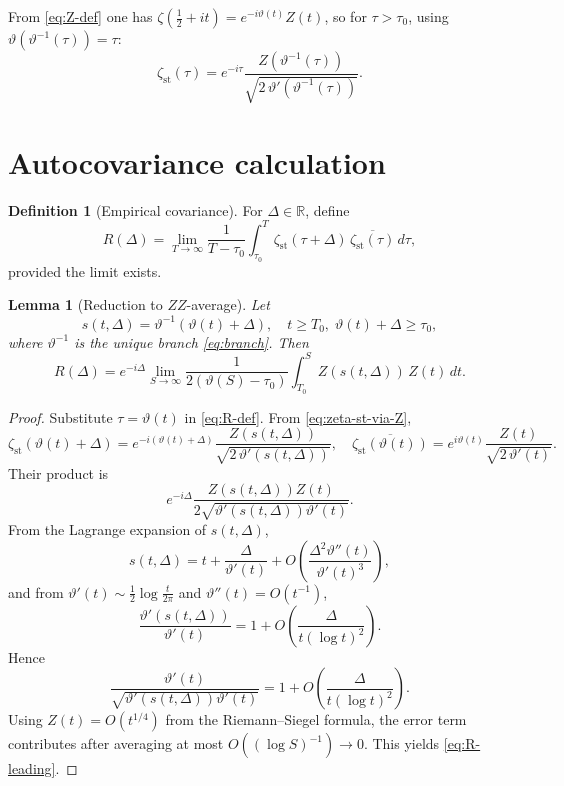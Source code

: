 \documentclass[11pt]{article}
\numberwithin{equation}{section}
\theoremstyle{plain}
\newtheorem{lemma}[theorem]{Lemma}
\theoremstyle{definition}
\newtheorem{definition}[theorem]{Definition}
\begin{document}
From \eqref{eq:Z-def} one has \(\zeta(\frac12+it)=e^{-i\vartheta(t)}Z(t)\), so for
\(\tau>\tau_0\), using \(\vartheta(\vartheta^{-1}(\tau))=\tau\):
\begin{equation}
\zeta_{\mathrm{st}}(\tau)
=
e^{-i\tau}
\frac{
Z(\vartheta^{-1}(\tau))
}{
\sqrt{2\,\vartheta'(\vartheta^{-1}(\tau))}
}.
\label{eq:zeta-st-via-Z}
\end{equation}

\section{Autocovariance calculation}

\begin{definition}[Empirical covariance]
For \(\Delta\in\mathbb{R}\), define
\begin{equation}
R(\Delta)
=
\lim_{T\to\infty}
\frac{1}{T-\tau_0}
\int_{\tau_0}^T
\zeta_{\mathrm{st}}(\tau+\Delta)\,
\overline{\zeta_{\mathrm{st}}(\tau)}\,d\tau,
\label{eq:R-def}
\end{equation}
provided the limit exists.
\end{definition}

\begin{lemma}[Reduction to \(ZZ\)-average]
Let
\begin{equation}
s(t,\Delta)=\vartheta^{-1}(\vartheta(t)+\Delta),
\quad t\ge T_0,\;\vartheta(t)+\Delta\ge\tau_0,
\label{eq:s-def}
\end{equation}
where \(\vartheta^{-1}\) is the unique branch \eqref{eq:branch}. Then
\begin{equation}
R(\Delta)
=
e^{-i\Delta}
\lim_{S\to\infty}
\frac{1}{2(\vartheta(S)-\tau_0)}
\int_{T_0}^S
Z(s(t,\Delta))\,Z(t)\,dt.
\label{eq:R-leading}
\end{equation}
\end{lemma}

\begin{proof}
Substitute \(\tau=\vartheta(t)\) in \eqref{eq:R-def}. From \eqref{eq:zeta-st-via-Z},
\[
\zeta_{\mathrm{st}}(\vartheta(t)+\Delta)
=e^{-i(\vartheta(t)+\Delta)}
\frac{Z(s(t,\Delta))}{\sqrt{2\,\vartheta'(s(t,\Delta))}},
\quad
\overline{\zeta_{\mathrm{st}}(\vartheta(t))}
=e^{i\vartheta(t)}
\frac{Z(t)}{\sqrt{2\,\vartheta'(t)}}.
\]
Their product is
\[
e^{-i\Delta}
\frac{Z(s(t,\Delta))Z(t)}{2\sqrt{\vartheta'(s(t,\Delta))\vartheta'(t)}}.
\]
From the Lagrange expansion of \(s(t,\Delta)\),
\[
s(t,\Delta)=t+\frac{\Delta}{\vartheta'(t)}+O\!\left(\frac{\Delta^2\vartheta''(t)}{\vartheta'(t)^3}\right),
\]
and from \(\vartheta'(t)\sim\frac12\log\frac{t}{2\pi}\) and \(\vartheta''(t)=O(t^{-1})\),
\[
\frac{\vartheta'(s(t,\Delta))}{\vartheta'(t)}=1+O\!\left(\frac{\Delta}{t(\log t)^2}\right).
\]
Hence
\[
\frac{\vartheta'(t)}{\sqrt{\vartheta'(s(t,\Delta))\vartheta'(t)}}
=1+O\!\left(\frac{\Delta}{t(\log t)^2}\right).
\]
Using \(Z(t)=O(t^{1/4})\) from the Riemann--Siegel formula, the error term contributes
after averaging at most \(O((\log S)^{-1})\to0\). This yields \eqref{eq:R-leading}.
\end{proof}
\end{document}
